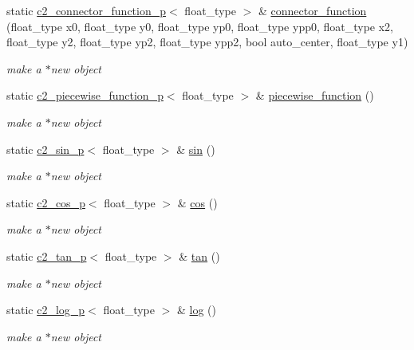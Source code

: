 \begin{DoxyCompactItemize}
static \hyperlink{classc2__connector__function__p}{c2\+\_\+connector\+\_\+function\+\_\+p}$<$ float\+\_\+type $>$ \& \hyperlink{classc2__factory_a8424d3a67d8e0cbe25f8ad8499da3cd7}{connector\+\_\+function} (float\+\_\+type x0, float\+\_\+type y0, float\+\_\+type yp0, float\+\_\+type ypp0, float\+\_\+type x2, float\+\_\+type y2, float\+\_\+type yp2, float\+\_\+type ypp2, bool auto\+\_\+center, float\+\_\+type y1)
\begin{DoxyCompactList}\small\item\em make a $\ast$new object \end{DoxyCompactList}\item 
static \hyperlink{classc2__piecewise__function__p}{c2\+\_\+piecewise\+\_\+function\+\_\+p}$<$ float\+\_\+type $>$ \& \hyperlink{classc2__factory_ae8073f403ae804870d8ce71e67175507}{piecewise\+\_\+function} ()
\begin{DoxyCompactList}\small\item\em make a $\ast$new object \end{DoxyCompactList}\item 
static \hyperlink{classc2__sin__p}{c2\+\_\+sin\+\_\+p}$<$ float\+\_\+type $>$ \& \hyperlink{classc2__factory_a866854d4fdd6c6678512151dbcd635a5}{sin} ()
\begin{DoxyCompactList}\small\item\em make a $\ast$new object \end{DoxyCompactList}\item 
static \hyperlink{classc2__cos__p}{c2\+\_\+cos\+\_\+p}$<$ float\+\_\+type $>$ \& \hyperlink{classc2__factory_abc5ea51417ecef590629a39f7a2227e4}{cos} ()
\begin{DoxyCompactList}\small\item\em make a $\ast$new object \end{DoxyCompactList}\item 
static \hyperlink{classc2__tan__p}{c2\+\_\+tan\+\_\+p}$<$ float\+\_\+type $>$ \& \hyperlink{classc2__factory_a2f83cbd3be646166f7e3bef1e27244b9}{tan} ()
\begin{DoxyCompactList}\small\item\em make a $\ast$new object \end{DoxyCompactList}\item 
static \hyperlink{classc2__log__p}{c2\+\_\+log\+\_\+p}$<$ float\+\_\+type $>$ \& \hyperlink{classc2__factory_af20c7c4fee421c8ee0b51bac1c42302e}{log} ()
\begin{DoxyCompactList}\small\item\em make a $\ast$new object \end{DoxyCompactList}\item 

\end{DoxyCompactItemize}
